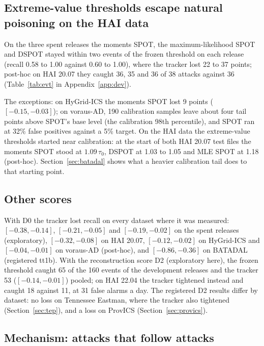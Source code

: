 \documentclass[sigconf]{acmart}
\begin{document}
\subsection{Extreme-value thresholds escape natural poisoning on the HAI data}
\label{sec:evt}

On the three spent releases the moments SPOT, the maximum-likelihood SPOT and DSPOT stayed within two
events of the frozen threshold on each release (recall 0.58 to 1.00 against 0.60 to 1.00), where the tracker lost 22 to 37 points; post-hoc
on HAI 20.07 they caught 36, 35 and 36 of 38 attacks against 36 (Table~\ref{tab:evt} in
Appendix~\ref{app:dev}).

The exceptions: on HyGrid-ICS the moments SPOT lost 9 points ($[-0.15, -0.03]$); on voraus-AD, 190
calibration samples leave about four tail points above SPOT's base level (the calibration 98th
percentile), and SPOT ran at 32\% false positives against a 5\% target. On the HAI data the
extreme-value thresholds started near calibration: at the start of both HAI 20.07 test files the
moments SPOT stood at $1.09\,\tau_0$, DSPOT at 1.03 to 1.05 and MLE SPOT at 1.18 (post-hoc).
Section~\ref{sec:batadal} shows what a heavier calibration tail does to that starting point.

\subsection{Other scores}

With D0 the tracker lost recall on every dataset where it was measured: $[-0.38, -0.14]$,
$[-0.21, -0.05]$ and $[-0.19, -0.02]$ on the spent releases (exploratory), $[-0.32, -0.08]$ on HAI
20.07, $[-0.12, -0.02]$ on HyGrid-ICS and $[-0.04, -0.01]$ on voraus-AD (post-hoc), and
$[-0.86, -0.36]$ on BATADAL (registered tt1b). With the reconstruction score D2
(exploratory here), the frozen threshold caught 65 of the 160 events of the development releases and
the tracker 53 ($[-0.14, -0.01]$) pooled; on HAI 22.04 the tracker tightened instead and caught 18
against 11, at 31 false alarms a day. The registered D2 results differ by dataset: no loss on Tennessee
Eastman, where the tracker also tightened (Section~\ref{sec:tep}), and a loss on ProvICS
(Section~\ref{sec:provics}).

\subsection{Mechanism: attacks that follow attacks}
\end{document}
